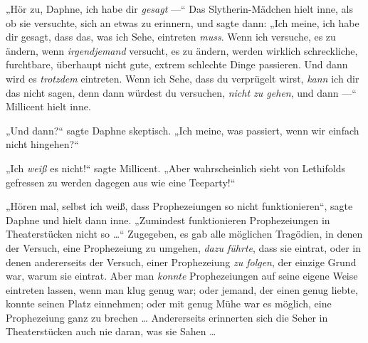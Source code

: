 „Hör zu, Daphne, ich habe dir \emph{gesagt} —“ Das Slytherin-Mädchen hielt inne, als ob sie versuchte, sich an etwas zu erinnern, und sagte dann:
„Ich meine, ich habe dir gesagt, dass das, was ich Sehe, eintreten \emph{muss}. Wenn ich versuche, es zu ändern, wenn \emph{irgendjemand} versucht, es zu ändern, werden wirklich schreckliche, furchtbare, überhaupt nicht gute, extrem schlechte Dinge passieren. Und dann wird es \emph{trotzdem} eintreten. Wenn ich Sehe, dass du verprügelt wirst, \emph{kann} ich dir das nicht sagen, denn dann würdest du versuchen, \emph{nicht zu gehen}, und dann —“ Millicent hielt inne.

„Und dann?“ sagte Daphne skeptisch.
„Ich meine, was passiert, wenn wir einfach nicht hingehen?“

„Ich \emph{weiß} es nicht!“ sagte Millicent.
„Aber wahrscheinlich sieht von Lethifolds gefressen zu werden dagegen aus wie eine Teeparty!“

„Hören mal, selbst ich weiß, dass Prophezeiungen so nicht funktionieren“, sagte Daphne und hielt dann inne.
„Zumindest funktionieren Prophezeiungen in Theaterstücken nicht so …“ Zugegeben, es gab alle möglichen Tragödien, in denen der Versuch, eine Prophezeiung zu umgehen, \emph{dazu führte}, dass sie eintrat, oder in denen andererseits der Versuch, einer Prophezeiung \emph{zu folgen}, der einzige Grund war, warum sie eintrat. Aber man \emph{konnte} Prophezeiungen auf seine eigene Weise eintreten lassen, wenn man klug genug war; oder jemand, der einen genug liebte, konnte seinen Platz einnehmen; oder mit genug Mühe war es möglich, eine Prophezeiung ganz zu brechen … Andererseits erinnerten sich die Seher in Theaterstücken auch nie daran, was sie Sahen …

